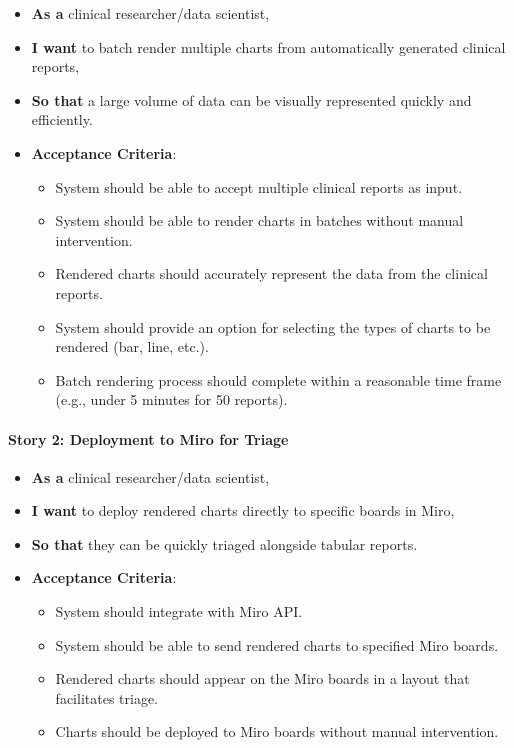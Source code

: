 \begin{itemize}
\item
  \textbf{As a} clinical researcher/data scientist,
\item
  \textbf{I want} to batch render multiple charts from automatically
  generated clinical reports,
\item
  \textbf{So that} a large volume of data can be visually represented
  quickly and efficiently.
\item
  \textbf{Acceptance Criteria}:

  \begin{itemize}
  \item
    System should be able to accept multiple clinical reports as input.
  \item
    System should be able to render charts in batches without manual
    intervention.
  \item
    Rendered charts should accurately represent the data from the
    clinical reports.
  \item
    System should provide an option for selecting the types of charts to
    be rendered (bar, line, etc.).
  \item
    Batch rendering process should complete within a reasonable time
    frame (e.g., under 5 minutes for 50 reports).
  \end{itemize}
\end{itemize}

\paragraph{Story 2: Deployment to Miro for
Triage}\label{story-2-deployment-to-miro-for-triage}

\begin{itemize}
\item
  \textbf{As a} clinical researcher/data scientist,
\item
  \textbf{I want} to deploy rendered charts directly to specific
  boards in Miro,
\item
  \textbf{So that} they can be quickly triaged alongside tabular
  reports.
\item
  \textbf{Acceptance Criteria}:

  \begin{itemize}
  \item
    System should integrate with Miro API.
  \item
    System should be able to send rendered charts to specified Miro
    boards.
  \item
    Rendered charts should appear on the Miro boards in a layout that
    facilitates triage.
  \item
    Charts should be deployed to Miro boards without manual
    intervention.
  \end{itemize}
\end{itemize}

